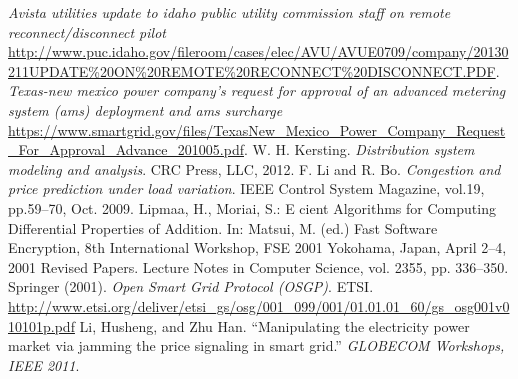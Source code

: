 \documentclass[11pt,oneside]{book}
\begin{document}
\begin{thebibliography}{99}
 \emph{Avista utilities update to idaho public utility commission staff on remote reconnect/disconnect pilot} \url{http://www.puc.idaho.gov/fileroom/cases/elec/AVU/AVUE0709/company/20130211UPDATE\%20ON\%20REMOTE\%20RECONNECT\%20DISCONNECT.PDF}.
 \emph{Texas-new mexico power company’s request for approval of an advanced metering system (ams) deployment and ams surcharge} \url{https://www.smartgrid.gov/files/TexasNew_Mexico_Power_Company_Request_For_Approval_Advance_201005.pdf}.
 W. H. Kersting. \emph{Distribution system modeling and analysis}. CRC Press, LLC, 2012.
 F. Li and R. Bo. \emph{Congestion and price prediction under load variation}. IEEE Control System Magazine, vol.19, pp.59–70, Oct. 2009.
 Lipmaa, H., Moriai, S.: E cient Algorithms for Computing Differential Properties of Addition. In: Matsui, M. (ed.) Fast Software Encryption, 8th International Workshop, FSE 2001 Yokohama, Japan, April 2–4, 2001 Revised Papers. Lecture Notes in Computer Science, vol. 2355, pp. 336–350. Springer (2001).
 \emph{Open Smart Grid Protocol (OSGP)}. ETSI. \url{http://www.etsi.org/deliver/etsi_gs/osg/001_099/001/01.01.01_60/gs_osg001v010101p.pdf}
 Li, Husheng, and Zhu Han. ``Manipulating the electricity power market via jamming the price signaling in smart grid.'' \emph{GLOBECOM Workshops, IEEE 2011}.
\end{thebibliography}
\end{document}
